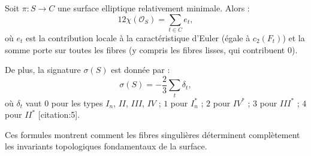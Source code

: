 \begin{theoreme}
Soit $\pi: S \to C$ une surface elliptique relativement minimale. Alors :
\[
12 \chi(\mathcal{O}_S) = \sum_{t \in C} e_t,
\]
où $e_t$ est la contribution locale à la caractéristique d'Euler (égale à $c_2(F_t)$) et la somme porte sur toutes les fibres (y compris les fibres lisses, qui contribuent $0$).
\end{theoreme}

De plus, la signature $\sigma(S)$ est donnée par :
\[
\sigma(S) = -\frac{2}{3} \sum_t \delta_t,
\]
où $\delta_t$ vaut $0$ pour les types $I_n$, $II$, $III$, $IV$ ; $1$ pour $I_n^*$ ; $2$ pour $IV^*$ ; $3$ pour $III^*$ ; $4$ pour $II^*$ [citation:5].

Ces formules montrent comment les fibres singulières déterminent complètement les invariants topologiques fondamentaux de la surface.
